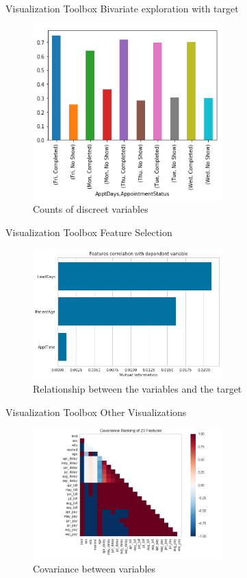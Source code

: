 \documentclass[10pt]{beamer}
\begin{document}
\begin{frame}{Visualization Toolbox}
Bivariate exploration with target
	\begin{figure}	
		\caption{Counts of discreet variables}
		\includegraphics[width=0.65\textwidth, center, trim=0cm 0cm 0 0cm]{images/count_bar_Weekday_target.png}
	\end{figure}
\end{frame}

\begin{frame}{Visualization Toolbox}
Feature Selection
	\begin{figure}	
		\caption{Relationship between the variables and the target}
		\includegraphics[width=0.65\textwidth, center, trim=0cm 0cm 0 0cm]{images/num_feature_corr_target.png}
	\end{figure}
\end{frame}

\begin{frame}{Visualization Toolbox}
Other Visualizations
	\begin{figure}	
		\caption{Covariance between variables}
		\includegraphics[width=0.65\textwidth, center, trim=0cm 0cm 0 0cm]{images/rank2d_covariance.png}
	\end{figure}
\end{frame}
\end{document}
